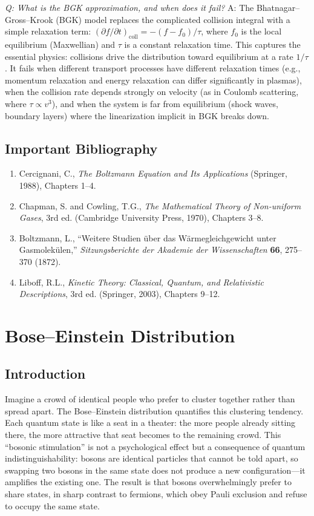 \documentclass[11pt,openright]{book}
\begin{document}
\textit{Q: What is the BGK approximation, and when does it fail?}
A: The Bhatnagar--Gross--Krook (BGK) model replaces the complicated collision integral with a simple relaxation term: $(\partial f/\partial t)_{\text{coll}} = -(f - f_0)/\tau$, where $f_0$ is the local equilibrium (Maxwellian) and $\tau$ is a constant relaxation time. This captures the essential physics: collisions drive the distribution toward equilibrium at a rate $1/\tau$. It fails when different transport processes have different relaxation times (e.g., momentum relaxation and energy relaxation can differ significantly in plasmas), when the collision rate depends strongly on velocity (as in Coulomb scattering, where $\tau \propto v^3$), and when the system is far from equilibrium (shock waves, boundary layers) where the linearization implicit in BGK breaks down.
\section*{Important Bibliography}
\begin{enumerate}
\item Cercignani, C., \textit{The Boltzmann Equation and Its Applications} (Springer, 1988), Chapters 1--4.
\item Chapman, S. and Cowling, T.G., \textit{The Mathematical Theory of Non-uniform Gases}, 3rd ed. (Cambridge University Press, 1970), Chapters 3--8.
\item Boltzmann, L., ``Weitere Studien über das Wärmegleichgewicht unter Gasmolekülen,'' \textit{Sitzungsberichte der Akademie der Wissenschaften} \textbf{66}, 275--370 (1872).
\item Liboff, R.L., \textit{Kinetic Theory: Classical, Quantum, and Relativistic Descriptions}, 3rd ed. (Springer, 2003), Chapters 9--12.
\end{enumerate}


\chapter{Bose--Einstein Distribution}

\section*{Introduction}

Imagine a crowd of identical people who prefer to cluster together rather than spread apart. The Bose--Einstein distribution quantifies this clustering tendency. Each quantum state is like a seat in a theater: the more people already sitting there, the more attractive that seat becomes to the remaining crowd. This ``bosonic stimulation'' is not a psychological effect but a consequence of quantum indistinguishability: bosons are identical particles that cannot be told apart, so swapping two bosons in the same state does not produce a new configuration---it amplifies the existing one. The result is that bosons overwhelmingly prefer to share states, in sharp contrast to fermions, which obey Pauli exclusion and refuse to occupy the same state.
\end{document}
